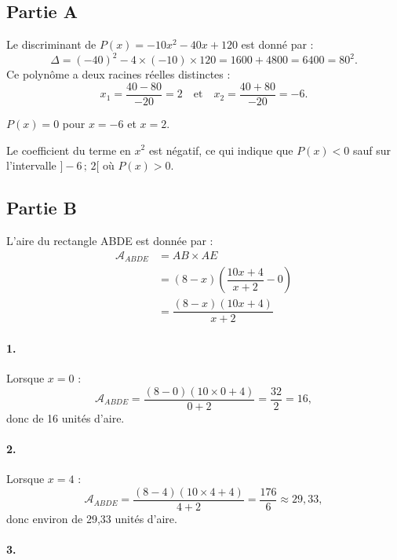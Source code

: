 \subsection*{Partie A}

Le discriminant de \( P(x) = -10x^2 - 40x + 120 \) est donné par :
\[
\Delta = (-40)^2 - 4 \times (-10) \times 120 = 1600 + 4800 = 6400 = 80^2.
\]
Ce polynôme a deux racines réelles distinctes :
\[
x_1 = \frac{40 - 80}{-20} = 2 \quad \text{et} \quad x_2 = \frac{40 + 80}{-20} = -6.
\]

\( P(x) = 0 \) pour \( x = -6 \) et \( x = 2 \).

Le coefficient du terme en \( x^2 \) est négatif, ce qui indique que \( P(x) < 0 \) sauf sur l'intervalle \( ]-6\,;\,2[ \) où \( P(x) > 0 \).

\subsection*{Partie B}

L'aire du rectangle ABDE est donnée par :
\begin{align*}
\mathcal{A}_{ABDE} &= AB \times AE \\
&= (8 - x)\left( \dfrac{10x + 4}{x + 2} - 0 \right) \\
&= \dfrac{(8 - x)(10x + 4)}{x + 2}
\end{align*}

\paragraph{1.} Lorsque \( x = 0 \) :
\[
\mathcal{A}_{ABDE} = \dfrac{(8 - 0)(10 \times 0 + 4)}{0 + 2} = \frac{32}{2} = 16,
\]
donc de 16 unités d'aire.

\paragraph{2.} Lorsque \( x = 4 \) :
\[
\mathcal{A}_{ABDE} = \dfrac{(8 - 4)(10 \times 4 + 4)}{4 + 2} = \frac{176}{6} \approx 29{,}33,
\]
donc environ de 29{,}33 unités d'aire.

\paragraph{3.}

